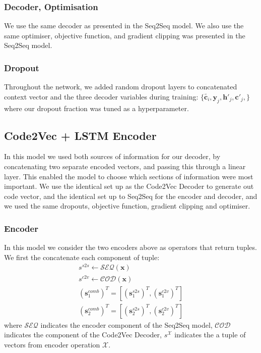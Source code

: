 \subsubsection{Decoder, Optimisation}

We use the same decoder as presented in the Seq2Seq model.
We also use the same optimiser, objective function, and gradient clipping was presented in the Seq2Seq model.

\subsubsection{Dropout}

Throughout the network, we added random dropout layers to concatenated context vector and the three decoder variables during training:
$\{\tilde{\textbf{c}_i}, \textbf{y}_j, \textbf{h}'_j,  \textbf{c}'_j,\}$
where our dropout fraction was tuned as a hyperparameter. 


\subsection{Code2Vec + LSTM Encoder} %
\label{sub:code2vec_sequence_to_sequence}

In this model we used both sources of information for our decoder, by concatenating two separate encoded vectors, and passing this through a linear layer. 
This enabled the model to choose which sections of information were most important.
We use the identical set up as the Code2Vec Decoder to generate out code vector, and the identical set up to Seq2Seq for the encoder and decoder, and we used the same dropouts, objective function, gradient clipping and optimiser.

\subsubsection{Encoder}

In this model we consider the two encoders above as operators that return tuples. We first the concatenate each component of tuple:
\begin{align}
    s^{s2s}  \gets \mathcal{SEQ}(\mathbf{x}) \\
    s^{c2v} \gets \mathcal{COD}(\mathbf{x}) \\
    (\mathbf{s}_1^{comb})^T = [ (\mathbf{s}^{s2s}_1)^T , (\mathbf{s}^{c2v}_1)^T ] \\
    (\mathbf{s}_2^{comb})^T  =  [ (\mathbf{s}^{s2s}_2)^T , (\mathbf{s}^{c2v}_2)^T ]  
\end{align}
where $\mathcal{SEQ}$ indicates the encoder component of the Seq2Seq model,
$\mathcal{COD}$ indicates the component of the Code2Vec Decoder, 
$s^\mathcal{X}$ indicates the a tuple of vectors from encoder operation $\mathcal{X}$.


